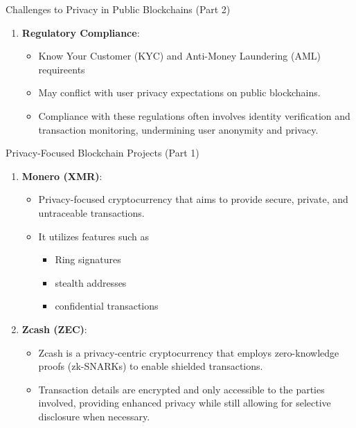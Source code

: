 \begin{withoutheadline}
\begin{frame}{Challenges to Privacy in Public Blockchains (Part 2)}
\begin{enumerate}
        \item \textbf{Regulatory Compliance}:
            \begin{itemize}
                \item Know Your Customer (KYC) and Anti-Money Laundering (AML) requireents
                \item May conflict with user privacy expectations on public blockchains.
                \item Compliance with these regulations often involves identity verification and transaction monitoring, undermining user anonymity and privacy.
            \end{itemize}
    \end{enumerate}
\end{frame}

\begin{frame}{Privacy-Focused Blockchain Projects (Part 1)}
    \begin{enumerate}
        \item \textbf{Monero (XMR)}:
            \begin{itemize}
                \item Privacy-focused cryptocurrency that aims to provide secure, private, and untraceable transactions.
                \item It utilizes features such as
                \begin{itemize}
                    \item Ring signatures
                    \item stealth addresses
                    \item confidential transactions
                \end{itemize}
            \end{itemize}
        
        \item \textbf{Zcash (ZEC)}:
            \begin{itemize}
                \item Zcash is a privacy-centric cryptocurrency that employs zero-knowledge proofs (zk-SNARKs) to enable shielded transactions.
                \item Transaction details are encrypted and only accessible to the parties involved, providing enhanced privacy while still allowing for selective disclosure when necessary.
            \end{itemize}
    \end{enumerate}
\end{frame}


\end{withoutheadline}
